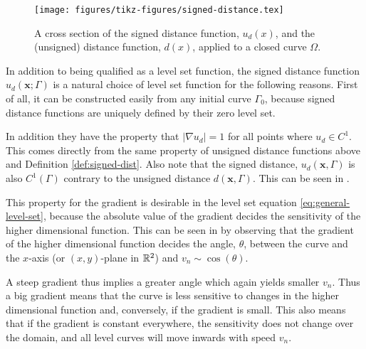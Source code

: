 \begin{figure}
    \centering
    \texttt{[image: figures/tikz-figures/signed-distance.tex]}
    \caption[Distance Functions]{A cross section of the signed distance function, $u_d(x)$, and the (unsigned) distance function, $d(x)$, applied to a closed curve $\Omega$.}
    \label{fig:distance-functions}
\end{figure}

In addition to being qualified as a level set function, the signed distance function $u_d(\mathbf{x}; \Gamma)$ is a natural choice of level set function for the following reasons. First of all, it can be constructed easily from any initial curve $\Gamma_0$, because signed distance functions are uniquely defined by their zero level set.

In addition they have the property that $|\nabla u_d| = 1$ for all points where $u_d \in C^1$. This comes directly from the same property of unsigned distance functions above and Definition \ref{def:signed-dist}. Also note that the signed distance, $u_d(\mathbf{x}, \Gamma)$ is also $C^1(\Gamma)$ contrary to the unsigned distance $d(\mathbf{x}, \Gamma)$. This can be seen in .



This property for the gradient is desirable in the level set equation \eqref{eq:general-level-set}, because the absolute value of the gradient decides the sensitivity of the higher dimensional function. This can be seen in  by observing that the gradient of the higher dimensional function decides the angle, $\theta$, between the curve and the $x$-axis (or $(x, y)$-plane in $\mathbb{R}^2$) and $v_n \sim \cos (\theta)$.

A steep gradient thus implies a greater angle which again yields smaller $v_n$. Thus a big gradient means that the curve is less sensitive to changes in the higher dimensional function and, conversely, if the gradient is small. This also means that if the gradient is constant everywhere, the sensitivity does not change over the domain, and all level curves will move inwards with speed $v_n$.

